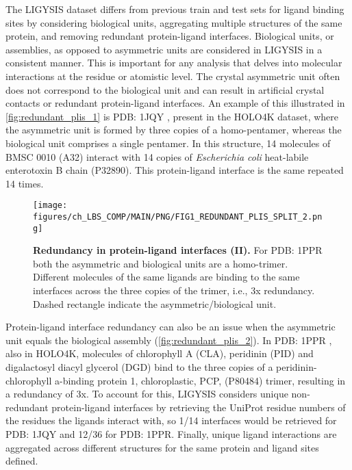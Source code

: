 The LIGYSIS dataset differs from previous train and test sets for ligand binding sites by considering biological units, aggregating multiple structures of the same protein, and removing redundant protein-ligand interfaces. Biological units, or assemblies, as opposed to asymmetric units are considered in LIGYSIS in a consistent manner. This is important for any analysis that delves into molecular interactions at the residue or atomistic level. The crystal asymmetric unit often does not correspond to the biological unit and can result in artificial crystal contacts or redundant protein-ligand interfaces. An example of this illustrated in \autoref{fig:redundant_plis_1} is PDB: 1JQY \cite{PICKENS_2002_ANCHOR}, present in the HOLO4K dataset, where the asymmetric unit is formed by three copies of a homo-pentamer, whereas the biological unit comprises a single pentamer. In this structure, 14 molecules of BMSC 0010 (A32) interact with 14 copies of \textit{Escherichia coli} heat-labile enterotoxin B chain (P32890). This protein-ligand interface is the same repeated 14 times.

\FloatBarrier

\begin{figure}[htb!]
    \centering
    \texttt{[image: figures/ch\_LBS\_COMP/MAIN/PNG/FIG1\_REDUNDANT\_PLIS\_SPLIT\_2.png]}
    \caption[Redundancy in protein-ligand interfaces (II)]{\textbf{Redundancy in protein-ligand interfaces (II).} For PDB: 1PPR both the asymmetric and biological units are a homo-trimer. Different molecules of the same ligands are binding to the same interfaces across the three copies of the trimer, i.e., 3x redundancy. Dashed rectangle indicate the asymmetric/biological unit.}
    \label{fig:redundant_plis_2}
\end{figure}

Protein-ligand interface redundancy can also be an issue when the asymmetric unit equals the biological assembly (\autoref{fig:redundant_plis_2}). In PDB: 1PPR \cite{HOFMANN_1996_CAROTENOID}, also in HOLO4K, molecules of chlorophyll A (CLA), peridinin (PID) and digalactosyl diacyl glycerol (DGD) bind to the three copies of a peridinin-chlorophyll a-binding protein 1, chloroplastic, PCP, (P80484) trimer, resulting in a redundancy of 3x. To account for this, LIGYSIS considers unique non-redundant protein-ligand interfaces by retrieving the UniProt residue numbers of the residues the ligands interact with, so 1/14 interfaces would be retrieved for PDB: 1JQY and 12/36 for PDB: 1PPR. Finally, unique ligand interactions are aggregated across different structures for the same protein and ligand sites defined.

